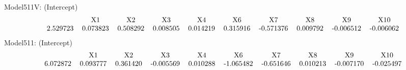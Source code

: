 \documentclass{article}
\begin{document}
  Model511V: (Intercept)    \setcounter{MaxMatrixCols}{20} \[\begin{tabular} {cccccccccc} & X1   &        X2  &         X3    &      X4&X6&X7     &      X8          & X9  &X10\\
    2.529723 &    0.073823 &    0.508292 &    0.008505 &    0.014219     &0.315916    &-0.571376    & 0.009792  &  -0.006512   &-0.006062  
  \end{tabular}\]
    Model511: (Intercept)    \setcounter{MaxMatrixCols}{20} \[\begin{tabular} {cccccccccc} & X1   &        X2  &         X3    &      X4&X6&X7     &      X8          & X9  &X10\\
    6.072872   &  0.093777  &   0.361420  &  -0.005569  &   0.010288    &-1.065482    &-0.651646 &   0.010213  &  -0.007170 &  -0.025497  
  \end{tabular}\]	
\end{document}
